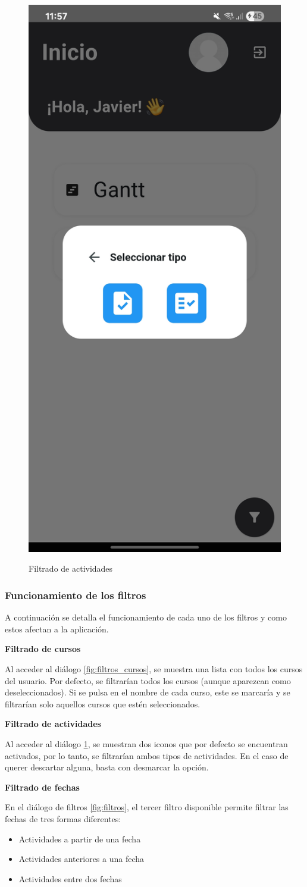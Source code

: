 \begin{figure}[H]
    \centering
    {\includegraphics[width=0.25\linewidth]{img/filtros_actividades.jpg}}
     {\caption{Filtrado de actividades}
     \label{fig:filtros_actividades}}
\end{figure}

\subsubsection{Funcionamiento de los filtros}
A continuación se detalla el funcionamiento de cada uno de los filtros y como estos afectan a la aplicación.

\textbf{Filtrado de cursos}

Al acceder al diálogo \ref{fig:filtros_cursos}, se muestra una lista con todos los cursos del usuario. Por defecto, se filtrarían todos los cursos (aunque aparezcan como deseleccionados). Si se pulsa en el nombre de cada curso, este se marcaría y se filtrarían solo aquellos cursos que estén seleccionados.

\textbf{Filtrado de actividades}

Al acceder al diálogo \ref{fig:filtros_actividades}, se muestran dos iconos que por defecto se encuentran activados, por lo tanto, se filtrarían ambos tipos de actividades. En el caso de querer descartar alguna, basta con desmarcar la opción.

\textbf{Filtrado de fechas}

En el diálogo de filtros \ref{fig:filtros}, el tercer filtro disponible permite filtrar las fechas de tres formas diferentes:
\begin{itemize}
    \item Actividades a partir de una fecha
    \item Actividades anteriores a una fecha
    \item Actividades entre dos fechas
\end{itemize}


